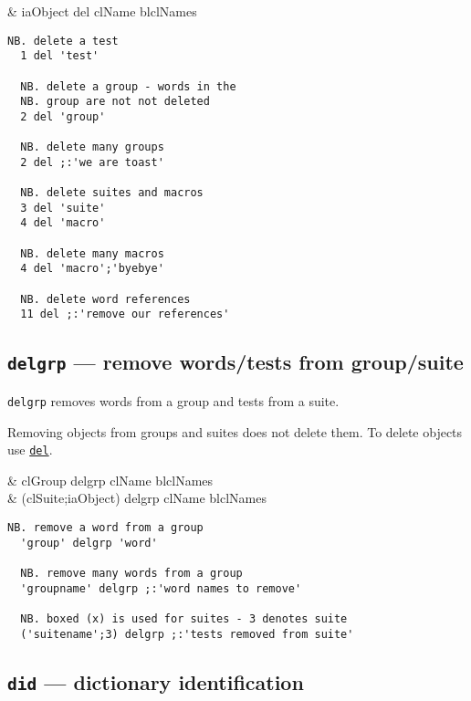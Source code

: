 \begin{wordhead}
\dyad & iaObject del clName \argsep blclNames \\
\end{wordhead}
\begin{lstlisting}[frame=single,framerule=0pt]
  NB. delete a test
  1 del 'test'  
  
  NB. delete a group - words in the
  NB. group are not not deleted 
  2 del 'group' 

  NB. delete many groups
  2 del ;:'we are toast' 
  
  NB. delete suites and macros 
  3 del 'suite'           
  4 del 'macro'
  
  NB. delete many macros
  4 del 'macro';'byebye'  
  
  NB. delete word references  
  11 del ;:'remove our references'  
\end{lstlisting}

\subsection{\texttt{delgrp} ---  remove words/tests from group/suite}

\texttt{delgrp} removes words from a group and tests from a suite.  

Removing objects from groups and suites does not delete them. To delete objects use 
\hyperlink{il:del}{\texttt{del}}.

\begin{wordhead}
\dyad & clGroup delgrp clName \argsep blclNames \\
      & (clSuite;iaObject) delgrp clName \argsep blclNames \\
\end{wordhead}
\begin{lstlisting}[frame=single,framerule=0pt]
  NB. remove a word from a group
  'group' delgrp 'word' 

  NB. remove many words from a group 
  'groupname' delgrp ;:'word names to remove'

  NB. boxed (x) is used for suites - 3 denotes suite
  ('suitename';3) delgrp ;:'tests removed from suite'
\end{lstlisting}

 
\subsection{\texttt{did} --- dictionary identification}\label{ss:did}

